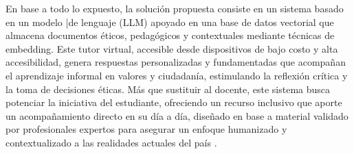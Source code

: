 En base a todo lo expuesto, la solución propuesta consiste en un sistema basado en un modelo |de lenguaje (LLM) apoyado en una base de datos vectorial que almacena documentos éticos, pedagógicos y contextuales mediante técnicas de embedding. Este tutor virtual, accesible desde dispositivos de bajo costo y alta accesibilidad, genera respuestas personalizadas y fundamentadas que acompañan el aprendizaje informal en valores y ciudadanía, estimulando la reflexión crítica y la toma de decisiones éticas. Más que sustituir al docente, este sistema busca potenciar la iniciativa del estudiante, ofreciendo un recurso inclusivo que aporte un acompañamiento directo en su día a día, diseñado en base a material validado por profesionales expertos para asegurar un enfoque humanizado y contextualizado a las realidades actuales del país \cite{unesco2021ethics,worldbank2022revolution,rivas2023future}.